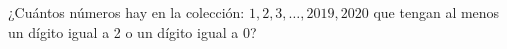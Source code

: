 ¿Cuántos números hay en la colección: $1, 2, 3, \dots, 2019, 2020$ que tengan al menos un dígito igual a 2 o un dígito igual a 0?